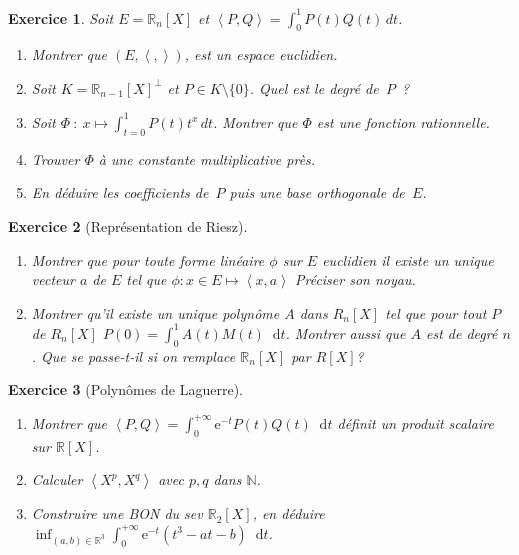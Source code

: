 \documentclass[12pt,a4paper]{article}
\newcommand{\ps}[2]{\left\langle#1,#2\right\rangle}
\newcommand{\R}{\mathbb{R}}
\newcommand{\N}{\mathbb{N}}
\newcommand{\diff}{\mathop{}\mathopen{}\mathrm{d}}%
\newcommand{\E}{\mathrm{e}}
{%
\theoremstyle{break}
\theoremprework{%
\rule{0.5\linewidth}{0.3pt}}
\theorempostwork{\hfill%
\rule{0.5\linewidth}{0.3pt}}
\theoremheaderfont{\scshape}
\theoremseparator{ ---}
\newtheorem{Prop}{%
\textcolor{blue}{Proposition}}
}
\theoremstyle{break}
\newtheorem{Exo}{Exercice}
\begin{document}
\begin{Exo}
Soit $E = \R_n[X]$ et $\ps{P}{Q} =  \int_{0}^1 P(t)Q(t)\,d t$.

\begin{enumerate}
  \item Montrer que $\left(E,\ps{}{} \right)$, est un espace euclidien.
  \item Soit $K = \R_{n-1}[X]^\bot$ et $P \in K\setminus\{0\}$.
    Quel est le degré de~$P$~?
  \item Soit $\Phi\ :\ x  \mapsto  \int_{t=0}^1 P(t)t^x\,d t$.
    Montrer que $\Phi$ est une fonction rationnelle.
    
  \item Trouver $\Phi$ à une constante multiplicative près.
    
  \item En déduire les coefficients de~$P$ puis  une base orthogonale de~$E$.
\end{enumerate}

\end{Exo}

\begin{Exo}[Représentation de Riesz]
\ 
\begin{enumerate}
\item
Montrer que pour toute forme linéaire $\phi$ sur $E$ euclidien il existe un unique vecteur  $a$ de $E$ tel que $\phi:x\in E\mapsto \ps{x}{a}$ Préciser son noyau.
\item
Montrer qu'il existe un unique polynôme $A$ dans $R_n[X]$ tel que pour tout $P$ de $R_n[X]$ $P(0)=\int_0^1A(t)M(t)\diff t$. Montrer aussi que $A$ est de degré $n$. Que se passe-t-il si on remplace $\R_n[X]$ par $R[X]$?
\end{enumerate}
\end{Exo}

\begin{Exo}[Polynômes de Laguerre]\ 
	\begin{enumerate}
		\item
		Montrer que $\ps{P}{Q}=\int_0^{+\infty}\E^{-t}P(t)Q(t)\diff t$ définit un produit scalaire sur $\R[X]$.
		\item
		Calculer $\ps{X^p}{X^q}$ avec $p,q$ dans $\N$.
		\item
		Construire une BON du sev $\R_2[X]$, en déduire $\inf_{\left( a,b\right)\in\R^3}\int_{0}^{+\infty}\E^{-t}(t^3-at-b)\diff t$.
	\end{enumerate}
	
\end{Exo}
\end{document}
